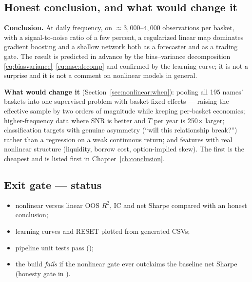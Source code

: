 \subsection{Honest conclusion, and what would change it}

\textbf{Conclusion.} At daily frequency, on $\approx3{,}000$--$4{,}000$ observations per
basket, with a signal-to-noise ratio of a few percent, a regularized linear map dominates
gradient boosting and a shallow network both as a forecaster and as a trading gate. The
result is predicted in advance by the bias--variance decomposition
\eqref{eq:biasvariance}--\eqref{eq:mse:decomp} and confirmed by the learning curve; it is
not a surprise and it is not a comment on nonlinear models in general.

\textbf{What would change it} (Section~\ref{sec:nonlinear:when}): pooling all 195 names'
baskets into one supervised problem with basket fixed effects --- raising the effective
sample by two orders of magnitude while keeping per-basket economics; higher-frequency data
where SNR is better and $T$ per year is 250$\times$ larger; classification targets with
genuine asymmetry (``will this relationship break?'') rather than a regression on a weak
continuous return; and features with real nonlinear structure (liquidity, borrow cost,
option-implied skew). The first is the cheapest and is listed first in
Chapter~\ref{ch:conclusion}.

\subsection{Exit gate --- status}

\begin{itemize}
  \item[\checkmark] nonlinear versus linear OOS $R^2$, IC and net Sharpe compared with an
    honest conclusion;
  \item[\checkmark] learning curves and RESET plotted from generated CSVs;
  \item[\checkmark] pipeline unit tests pass ();
  \item[\checkmark] the build \emph{fails} if the nonlinear gate ever outclaims the
    baseline net Sharpe (honesty gate in ).
\end{itemize}
